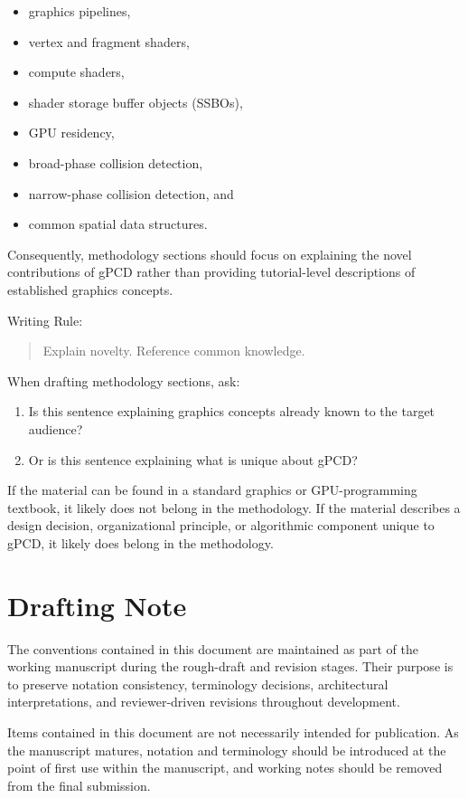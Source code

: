 \begin{itemize}
\item graphics pipelines,
\item vertex and fragment shaders,
\item compute shaders,
\item shader storage buffer objects (SSBOs),
\item GPU residency,
\item broad-phase collision detection,
\item narrow-phase collision detection, and
\item common spatial data structures.
\end{itemize}

Consequently, methodology sections should focus on explaining the
novel contributions of gPCD rather than providing tutorial-level
descriptions of established graphics concepts.

Writing Rule:

\begin{quote}
Explain novelty. Reference common knowledge.
\end{quote}

When drafting methodology sections, ask:

\begin{enumerate}
\item Is this sentence explaining graphics concepts already known to the
target audience?
\item Or is this sentence explaining what is unique about gPCD?
\end{enumerate}

If the material can be found in a standard graphics or GPU-programming
textbook, it likely does not belong in the methodology. If the material
describes a design decision, organizational principle, or algorithmic
component unique to gPCD, it likely does belong in the methodology.

\section{Drafting Note}

The conventions contained in this document are maintained as part of the
working manuscript during the rough-draft and revision stages. Their
purpose is to preserve notation consistency, terminology decisions,
architectural interpretations, and reviewer-driven revisions throughout
development.

Items contained in this document are not necessarily intended for
publication. As the manuscript matures, notation and terminology should
be introduced at the point of first use within the manuscript, and
working notes should be removed from the final submission.

